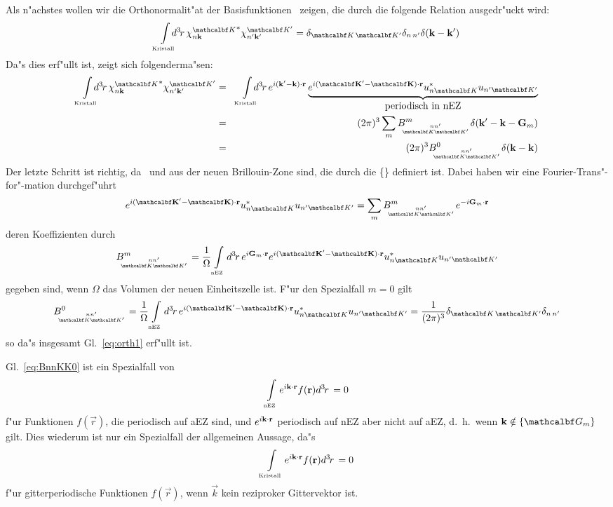 Als n"achstes wollen wir die Orthonormalit"at der Basisfunktionen \basis\
zeigen, die durch die folgende Relation ausgedr"uckt wird:
%
\begin{equation}
  \label{eq:orth1}
  \bzint{Kristall}\!\!\!\! \vdx{r} \cc{{\basis}} \pbasis =
  \kronecker{\set}{\pri{\set}} \kronecker{n}{\pri{n}}
  \delta(\nk-\pri{\nk}) 
\end{equation}
%
Da"s dies erf"ullt ist, zeigt sich folgenderma"sen:
%
\begin{eqnarray}
  \label{eq:orth2}
  \bzint{Kristall}\!\!\!\! \vdx{r} \cc{{\basis}}\pbasis & = & 
  \bzint{Kristall}\!\!\!\! \vdx{r} e^{i\sprod{(\pri{k}-k)}{r}}
  \underbrace{e^{i\sprod{(\pri{\set}-\set)}{r}}
  \cc{u_{n\set}}u_{\pri{n}\pri{\set}}}_{\mbox{periodisch in nEZ}} \nonumber \\
  &=& (2\pi)^{3} \sum_{m} \BnnKK{m} \delta(\pri{\nk}-\nk-\nG) \nonumber \\
  &=& (2\pi)^{3} \BnnKK{0} \delta(\vec{\nk}-\nk)
\end{eqnarray}
%
Der letzte Schritt ist richtig, da \nk\ und \pri{\nk} aus der neuen
Brillouin-Zone sind, die durch die \{\nG\} definiert ist. Dabei haben wir eine
Fourier-Trans"-for"-mation durchgef"uhrt
%
\begin{equation}
  \label{eq:bloch-Gm}
  e^{i\sprod{(\pri{\set}-\set)}{r}} \cc{u_{n\set}}u_{\pri{n}\pri{\set}} = 
  \sum_{m} \BnnKK{m} e^{-i\sprod{\nG}{r}}
\end{equation}
%
deren Koeffizienten  durch
%
\begin{displaymath}
  \BnnKK{m} = \frac{1}{\Omega} \bzint{nEZ} \vdx{r}
  e^{i\sprod{\nG}{r}} e^{i\sprod{(\pri{\set}-\set)}{r}}
  \cc{u_{n\set}}u_{\pri{n}\pri{\set}} 
\end{displaymath}
%
gegeben sind, wenn $\Omega$ das Volumen der neuen Einheitszelle ist.
F"ur den Spezialfall $m=0$ gilt
%
\begin{equation}
  \label{eq:BnnKK0}
  \BnnKK{0} = \frac{1}{\Omega} \bzint{nEZ} \vdx{r}
  e^{i\sprod{(\pri{\set}-\set)}{r}} \cc{u_{n\set}}u_{\pri{n}\pri{\set}} =
  \frac{1}{(2\pi)^{3}} \kronecker{\set}{\pri{\set}}
  \kronecker{n}{\pri{n}}
\end{equation}
%
so da"s insgesamt Gl.~\eqref{eq:orth1} erf"ullt ist.

Gl.~\eqref{eq:BnnKK0} ist ein Spezialfall von
%
\begin{equation}
  \label{eq:K.period}
  \int\limits_{\scriptscriptstyle \text{nEZ}}e^{i\mathbf{k} \cdot \mathbf{r} }f(\mathbf{r})d^{3}\!\!\: r\,=0
\end{equation}
%
f"ur Funktionen $f(\vec{r})$, die periodisch auf aEZ sind, und
$e^{i\mathbf{k} \cdot \mathbf{r} }$ periodisch auf nEZ aber nicht auf aEZ, d.~h.\  wenn
$\vec{k} \notin \{\aG\}$ gilt. 
Dies wiederum ist nur ein Spezialfall der allgemeinen Aussage, da"s
%
\begin{displaymath}
  \int\limits_{\scriptscriptstyle \text{Kristall}}e^{i\mathbf{k} \cdot \mathbf{r} }f(\mathbf{r})d^{3}\!\!\: r\,=0 
\end{displaymath}
f"ur gitterperiodische Funktionen $f(\vec{r})$, wenn $\vec{k}$ kein reziproker
Gittervektor ist.

